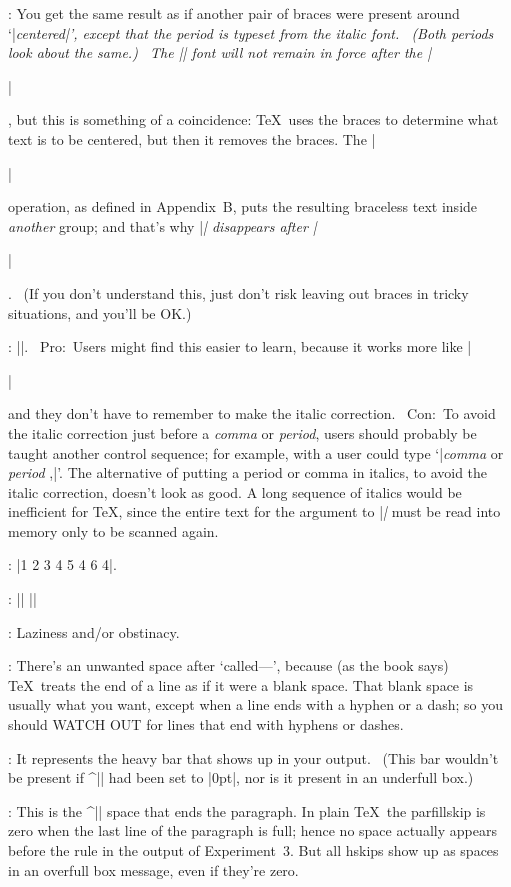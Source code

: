 :
 You get the same result as if another pair of braces were present
around `|\it centered|', except that the period is typeset from the
italic font. \ (Both periods look about the same.) \ The |\it| font
will not remain in force after the |\centerline|, but this is
something of a coincidence: \TeX\ uses the braces to determine what
text is to be centered, but then it removes the braces. The
|\centerline| operation, as defined in Appendix~B\null, puts the
resulting braceless text inside {\sl another\/} group; and that's why
|\it| disappears after |\centerline|. \ (If you don't understand this,
just don't risk leaving out braces in tricky situations, and you'll be OK.)

:
 |\def\ital#1{{\it#1\/}}|. \ Pro:~Users might find this easier to
learn, because it works more like |\centerline| and they don't have to
remember to make the italic correction. \ Con:~To avoid the italic correction
just before a {\it comma} or {\it period}, users should probably be taught
another control sequence; for example, with
\begintt
\def\nocorr{\kern0pt }
\endtt
a user could type `|\ital{comma} or \ital{period\nocorr},|'. The alternative
of putting a period or comma in italics, to avoid the italic correction,
doesn't look as good. A long sequence of italics would be inefficient for
\TeX, since the entire text for the argument to |\ital| must be read into
memory only to be scanned again.

:
 |{1 {2 3 4 5} 4 6} 4|.

:
 |\def\beginthe#1{\begingroup\def\blockname{#1}}|\parbreak
|\def\endthe#1{\def\test{#1}%
|  \ifx\test\blockname\endgroup|\parbreak
|  \else\errmessage{You should have said|\parbreak
|    \string\endthe{\blockname}}\fi}|

:
 Laziness and/or obstinacy.

:
 There's an unwanted space after `called---', because (as the book
says) \TeX\ treats the end of a line as if it were a blank space. That
blank space is usually what you want, except when a line ends with a
hyphen or a dash; so you should {\sc WATCH OUT} for lines that end with
hyphens or dashes.

:
 It represents the heavy bar that shows up in
your output. \ (This bar wouldn't be present if\/ ^|\overfullrule| had been
set to |0pt|, nor is it present in an underfull box.)

:
 This is the ^|\parfillskip| space that ends the paragraph.
In plain \TeX\ the parfillskip is zero when the last line of the paragraph
is full; hence no space actually appears before the rule in the output
of Experiment~3. But all hskips show up as spaces in an overfull box
message, even if they're zero.

